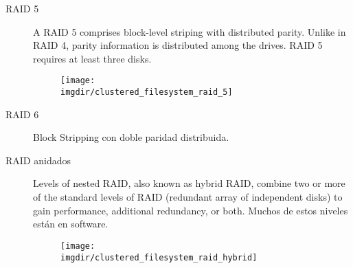 \documentclass[a4paper, twoside]{article}
\newcommand{\imgdir}{../resources/images} %
\begin{document}
\begin{description}
	\item[RAID 5] A RAID 5 comprises block-level striping with distributed parity. Unlike in RAID 4, parity information is distributed among the drives. RAID 5 requires at least three disks.
	\begin{figure}[h]
		\centering
		\texttt{[image: \\imgdir/clustered\_filesystem\_raid\_5]}
		\label{fig:clustered_filesystem_raid_5}
	\end{figure}

	\item[RAID 6] Block Stripping con doble paridad distribuida.

	\item[RAID anidados] Levels of nested RAID, also known as hybrid RAID, combine two or more of the standard levels of RAID (redundant array of independent disks) to gain performance, additional redundancy, or both. Muchos de estos niveles están en software.
	\begin{figure}[h]
		\centering
		\texttt{[image: \\imgdir/clustered\_filesystem\_raid\_hybrid]}
		\label{fig:clustered_filesystem_raid_hybrid}
	\end{figure}
\end{description}
\end{document}
